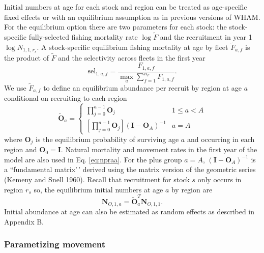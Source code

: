 \documentclass[
]{article}
\begin{document}
Initial numbers at age for each stock and region can be treated as age-specific fixed effects or with an equilibrium assumption as in previous versions of WHAM. For the equilibrium option there are two parameters for each stock: the stock-specific fully-selected fishing mortality rate \(\log \widetilde{F}\) and the recruitment in year 1 \(\log N_{1,1,r_s}\). A stock-specific equilibrium fishing mortality at age by fleet \({\tilde F}_{a,f}\) is the product of \(\widetilde{F}\) and the selectivity across fleets in the first year
\begin{equation*}
  \text{sel}_{1,a,f} = \frac{F_{1,a,f}}{\max_a \sum_{f=1}^{n_F} F_{1,a,f}}.
\end{equation*}
We use \(\widetilde{F}_{a,f}\) to define an equilibrium abundance per recruit by region at age \(a\) conditional on recruiting to each region
\begin{equation}\label{eq:npraa}
 \widetilde{\mathbf{O}}_{a} = \left\{
 \begin{array}{ll}
\prod^{a-1}_{j=0}\mathbf{O}_{j}  & 1\leq a<A\\
\left[\prod^{a-1}_{j=0}\mathbf{O}_{j}\right] \left(\mathbf{I} - \mathbf{O}_{A}\right)^{-1} & a = A
 \end{array}
\right.
\end{equation}
where \(\mathbf{O}_{j}\) is the equilibrium probability of surviving age \(a\) and occurring in each region and \(\mathbf{O}_{0} = \mathbf{I}\). Natural mortality and movement rates in the first year of the model are also used in Eq. \ref{eq:npraa}. For the plus group \(a=A\), \(\left(\mathbf{I} - \mathbf{O}_{A}\right)^{-1}\) is a ``fundamental matrix'\,' derived using the matrix version of the geometric series (Kemeny and Snell 1960). Recall that recruitment for stock \(s\) only occurs in region \(r_s\) so, the equilibrium initial numbers at age \(a\) by region are
\[\mathbf{N}_{O,1,a} = \widetilde{\mathbf{O}}_{a}^T \mathbf{N}_{O,1,1}.\]
Initial abundance at age can also be estimated as random effects as described in Appendix B.

\hypertarget{parametizing-movement}{%
\subsubsection*{Parametizing movement}\label{parametizing-movement}}
\end{document}
